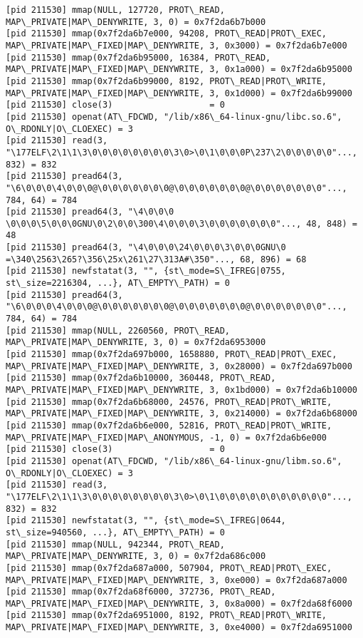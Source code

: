 \documentclass[a4paper, 12pt]{article}
\begin{document}
\begin{lstlisting}
[pid 211530] mmap(NULL, 127720, PROT\_READ, MAP\_PRIVATE|MAP\_DENYWRITE, 3, 0) = 0x7f2da6b7b000
[pid 211530] mmap(0x7f2da6b7e000, 94208, PROT\_READ|PROT\_EXEC, MAP\_PRIVATE|MAP\_FIXED|MAP\_DENYWRITE, 3, 0x3000) = 0x7f2da6b7e000
[pid 211530] mmap(0x7f2da6b95000, 16384, PROT\_READ, MAP\_PRIVATE|MAP\_FIXED|MAP\_DENYWRITE, 3, 0x1a000) = 0x7f2da6b95000
[pid 211530] mmap(0x7f2da6b99000, 8192, PROT\_READ|PROT\_WRITE, MAP\_PRIVATE|MAP\_FIXED|MAP\_DENYWRITE, 3, 0x1d000) = 0x7f2da6b99000
[pid 211530] close(3)                   = 0
[pid 211530] openat(AT\_FDCWD, "/lib/x86\_64-linux-gnu/libc.so.6", O\_RDONLY|O\_CLOEXEC) = 3
[pid 211530] read(3, "\177ELF\2\1\1\3\0\0\0\0\0\0\0\0\3\0>\0\1\0\0\0P\237\2\0\0\0\0\0"..., 832) = 832
[pid 211530] pread64(3, "\6\0\0\0\4\0\0\0@\0\0\0\0\0\0\0@\0\0\0\0\0\0\0@\0\0\0\0\0\0\0"..., 784, 64) = 784
[pid 211530] pread64(3, "\4\0\0\0 \0\0\0\5\0\0\0GNU\0\2\0\0\300\4\0\0\0\3\0\0\0\0\0\0\0"..., 48, 848) = 48
[pid 211530] pread64(3, "\4\0\0\0\24\0\0\0\3\0\0\0GNU\0 =\340\2563\265?\356\25x\261\27\313A#\350"..., 68, 896) = 68
[pid 211530] newfstatat(3, "", {st\_mode=S\_IFREG|0755, st\_size=2216304, ...}, AT\_EMPTY\_PATH) = 0
[pid 211530] pread64(3, "\6\0\0\0\4\0\0\0@\0\0\0\0\0\0\0@\0\0\0\0\0\0\0@\0\0\0\0\0\0\0"..., 784, 64) = 784
[pid 211530] mmap(NULL, 2260560, PROT\_READ, MAP\_PRIVATE|MAP\_DENYWRITE, 3, 0) = 0x7f2da6953000
[pid 211530] mmap(0x7f2da697b000, 1658880, PROT\_READ|PROT\_EXEC, MAP\_PRIVATE|MAP\_FIXED|MAP\_DENYWRITE, 3, 0x28000) = 0x7f2da697b000
[pid 211530] mmap(0x7f2da6b10000, 360448, PROT\_READ, MAP\_PRIVATE|MAP\_FIXED|MAP\_DENYWRITE, 3, 0x1bd000) = 0x7f2da6b10000
[pid 211530] mmap(0x7f2da6b68000, 24576, PROT\_READ|PROT\_WRITE, MAP\_PRIVATE|MAP\_FIXED|MAP\_DENYWRITE, 3, 0x214000) = 0x7f2da6b68000
[pid 211530] mmap(0x7f2da6b6e000, 52816, PROT\_READ|PROT\_WRITE, MAP\_PRIVATE|MAP\_FIXED|MAP\_ANONYMOUS, -1, 0) = 0x7f2da6b6e000
[pid 211530] close(3)                   = 0
[pid 211530] openat(AT\_FDCWD, "/lib/x86\_64-linux-gnu/libm.so.6", O\_RDONLY|O\_CLOEXEC) = 3
[pid 211530] read(3, "\177ELF\2\1\1\3\0\0\0\0\0\0\0\0\3\0>\0\1\0\0\0\0\0\0\0\0\0\0\0"..., 832) = 832
[pid 211530] newfstatat(3, "", {st\_mode=S\_IFREG|0644, st\_size=940560, ...}, AT\_EMPTY\_PATH) = 0
[pid 211530] mmap(NULL, 942344, PROT\_READ, MAP\_PRIVATE|MAP\_DENYWRITE, 3, 0) = 0x7f2da686c000
[pid 211530] mmap(0x7f2da687a000, 507904, PROT\_READ|PROT\_EXEC, MAP\_PRIVATE|MAP\_FIXED|MAP\_DENYWRITE, 3, 0xe000) = 0x7f2da687a000
[pid 211530] mmap(0x7f2da68f6000, 372736, PROT\_READ, MAP\_PRIVATE|MAP\_FIXED|MAP\_DENYWRITE, 3, 0x8a000) = 0x7f2da68f6000
[pid 211530] mmap(0x7f2da6951000, 8192, PROT\_READ|PROT\_WRITE, MAP\_PRIVATE|MAP\_FIXED|MAP\_DENYWRITE, 3, 0xe4000) = 0x7f2da6951000

\end{lstlisting}
\end{document}
